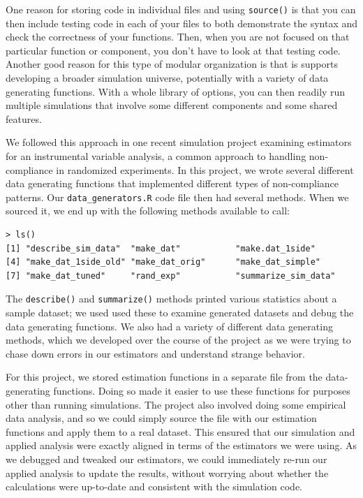 \documentclass[
]{book}
\begin{document}
One reason for storing code in individual files and using \texttt{source()} is that you can then include testing code in each of your files to both demonstrate the syntax and check the correctness of your functions.
Then, when you are not focused on that particular function or component, you don't have to look at that testing code.
Another good reason for this type of modular organization is that is supports developing a broader simulation universe, potentially with a variety of data generating functions.
With a whole library of options, you can then readily run multiple simulations that involve some different components and some shared features.

We followed this approach in one recent simulation project examining estimators for an instrumental variable analysis, a common approach to handling non-compliance in randomized experiments.
In this project, we wrote several different data generating functions that implemented different types of non-compliance patterns.
Our \texttt{data\_generators.R} code file then had several methods.
When we sourced it, we end up with the following methods available to call:

\begin{verbatim}
> ls()
[1] "describe_sim_data"  "make_dat"           "make.dat_1side"     
[4] "make_dat_1side_old" "make_dat_orig"      "make_dat_simple"
[7] "make_dat_tuned"     "rand_exp"           "summarize_sim_data"
\end{verbatim}

The \texttt{describe()} and \texttt{summarize()} methods printed various statistics about a sample dataset; we used used these to examine generated datasets and debug the data generating functions.
We also had a variety of different data generating methods, which we developed over the course of the project as we were trying to chase down errors in our estimators and understand strange behavior.

For this project, we stored estimation functions in a separate file from the data-generating functions.
Doing so made it easier to use these functions for purposes other than running simulations.
The project also involved doing some empirical data analysis, and so we could simply source the file with our estimation functions and apply them to a real dataset.
This ensured that our simulation and applied analysis were exactly aligned in terms of the estimators we were using.
As we debugged and tweaked our estimators, we could immediately re-run our applied analysis to update the results, without worrying about whether the calculations were up-to-date and consistent with the simulation code.
\end{document}
